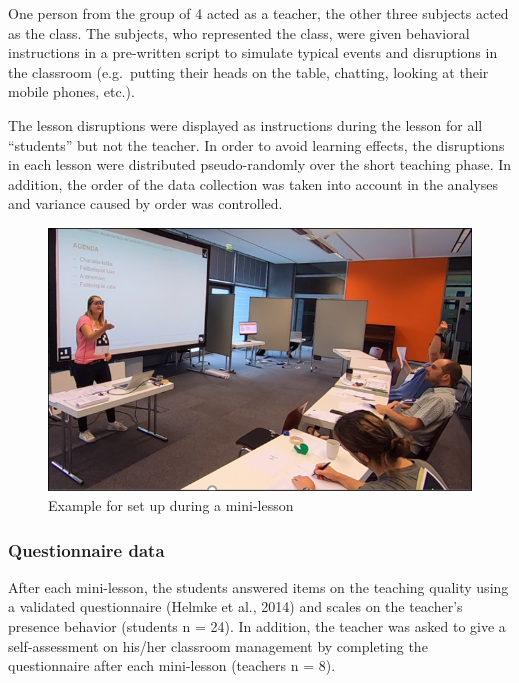 \documentclass[
  english,
  man,floatsintext]{apa6}
\begin{document}
One person from the group of 4 acted as a teacher, the other three subjects acted as the class. The subjects, who represented the class, were given behavioral instructions in a pre-written script to simulate typical events and disruptions in the classroom (e.g.~putting their heads on the table, chatting, looking at their mobile phones, etc.).

The lesson disruptions were displayed as instructions during the lesson for all ``students'' but not the teacher. In order to avoid learning effects, the disruptions in each lesson were distributed pseudo-randomly over the short teaching phase. In addition, the order of the data collection was taken into account in the analyses and variance caused by order was controlled.



\begin{figure}

{\centering \includegraphics[width=5.94in]{./pictures/datacollection} 

}

\caption{Example for set up during a mini-lesson}\label{fig:datacollection}
\end{figure}

\hypertarget{questionnaire-data}{%
\subsubsection{Questionnaire data}\label{questionnaire-data}}

After each mini-lesson, the students answered items on the teaching quality using a validated questionnaire (Helmke et al., 2014) and scales on the teacher's presence behavior (students n = 24). In addition, the teacher was asked to give a self-assessment on his/her classroom management by completing the questionnaire after each mini-lesson (teachers n = 8).
\end{document}
